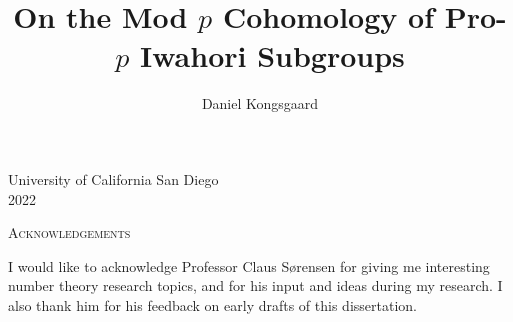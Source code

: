 \documentclass[letterpaper,oneside,english,11pt,openany]{memoir}
\title{On the Mod \texorpdfstring{$p$}{p} Cohomology of Pro-\texorpdfstring{$p$}{p} Iwahori Subgroups}
\author{Daniel Kongsgaard}
\begin{document}
\DoubleSpacing


\hypersetup{pageanchor=false}
\pagestyle{empty}



\clearpage
\null
\clearpage

\hypersetup{pageanchor=true}
\frontmatter

\pagestyle{plain}

\setcounter{page}{3}



\vfill

\begin{center}
  {\large University of California San Diego} \\[1em]
  {\large 2022}
\end{center}

\clearpage

\renewcommand*{\chaptitlefont}{\centering\Large\scshape}

\renewcommand{\contentsname}{Table of Contents}
\renewcommand{\cftchaptername}{\chaptername~}
\renewcommand{\cftappendixname}{\appendixname~}
\renewcommand*{\cftchapterleader}{\bfseries\cftdotfill{\cftchapterdotsep}}
\renewcommand*{\cftchapterdotsep}{\cftdotsep}
\tableofcontents

\clearpage

\printnomenclature[4cm]

\clearpage

\renewcommand{\cfttablename}{\tablename~}
\listoftables

\clearpage


\begin{center}
  \Large\scshape Acknowledgements
\end{center}

I would like to acknowledge Professor Claus Sørensen for giving me interesting number theory research topics, and for his input and ideas during my research. I also thank him for his feedback on early drafts of this dissertation.
\end{document}
